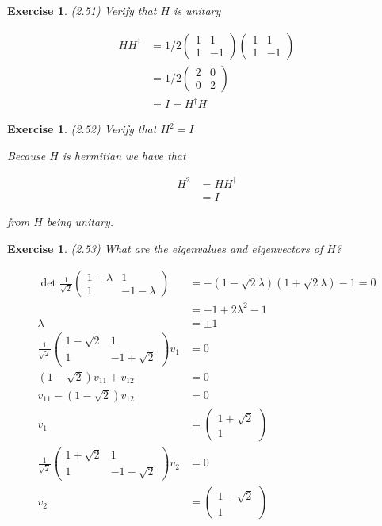 \documentclass[11pt]{article}
\newcommand\0{\mathbf{0}}
\newcommand\<{\langle}
\renewcommand\>{\rangle}
\newtheorem{exercise}[theorem]{Exercise}
\begin{document}
\begin{exercise}
(2.51) Verify that $H$ is unitary 

\begin{align*}
HH^\dag &= 1/2\begin{pmatrix} 1 & 1 \\ 1 & -1\end{pmatrix}\begin{pmatrix} 1 & 1 \\ 1 & -1\end{pmatrix} \\
&= 1/2\begin{pmatrix} 2 & 0 \\ 0 & 2 \end{pmatrix} \\
&= I = H^\dag H
\end{align*}
\end{exercise}

\begin{exercise}
(2.52) Verify that $H^2 = I$

Because $H$ is hermitian we have that 

\begin{align*}
H^2 &= HH^\dag \\
&= I
\end{align*}

from $H$ being unitary.
\end{exercise}

\begin{exercise}
(2.53) What are the eigenvalues and eigenvectors of $H$?

\begin{align*}
\det \frac{1}{\sqrt{2}}\begin{pmatrix} 1 - \lambda & 1 \\ 1 & -1 - \lambda\end{pmatrix}
&= -(1-\sqrt{2}\lambda)(1+\sqrt{2}\lambda) - 1 = 0 \\
&= -1 + 2\lambda^2 -1 \\
\lambda &= \pm 1 \\
\frac{1}{\sqrt{2}}\begin{pmatrix} 1-\sqrt{2} & 1 \\ 1 & -1 +\sqrt{2}\end{pmatrix}v_1 &= 0 \\
(1-\sqrt{2})v_{11} + v_{12} &= 0 \\
v_{11} -(1-\sqrt{2})v_{12} &= 0 \\
v_1 &= \begin{pmatrix} 1 + \sqrt{2} \\ 1\end{pmatrix} \\
\frac{1}{\sqrt{2}}\begin{pmatrix} 1+\sqrt{2} & 1 \\ 1 & -1 -\sqrt{2}\end{pmatrix}v_2 &= 0 \\ 
v_2 &= \begin{pmatrix} 1 - \sqrt{2} \\ 1\end{pmatrix}
\end{align*}
	
\end{exercise}
\end{document}
